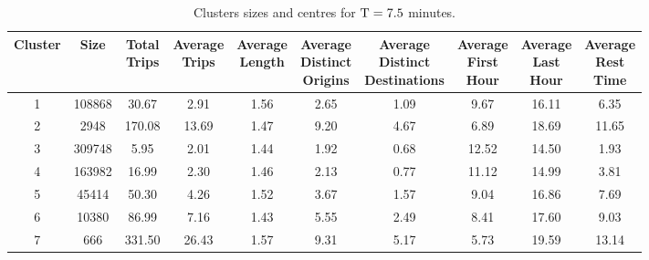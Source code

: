 \begin{table*}[t]
\centering
\small
\begin{tabular}{c c c c c c c c c c}
  \hline
 Cluster &  Size & \thead{Total\\Trips} & \thead{Average\\Trips} & \thead{Average\\Length} & \thead{Average\\Distinct\\Origins} & \thead{Average\\Distinct\\Destinations} & \thead{Average\\First\\Hour} & \thead{Average\\Last\\Hour} & \thead{Average\\Rest\\Time} \\
  \hline
  1 & 108868 & 30.67 & 2.91 & 1.56 & 2.65 & 1.09 & 9.67 & 16.11 & 6.35 \\
  2 & 2948 & 170.08 & 13.69 & 1.47 & 9.20 & 4.67 & 6.89 & 18.69 & 11.65 \\
  3 & 309748 & 5.95 & 2.01 & 1.44 & 1.92 & 0.68 & 12.52 & 14.50 & 1.93 \\
  4 & 163982 & 16.99 & 2.30 & 1.46 & 2.13 & 0.77 & 11.12 & 14.99 & 3.81 \\
  5 & 45414 & 50.30 & 4.26 & 1.52 & 3.67 & 1.57 & 9.04 & 16.86 & 7.69 \\
  6 & 10380 & 86.99 & 7.16 & 1.43 & 5.55 & 2.49 & 8.41 & 17.60 & 9.03 \\
  7 & 666 & 331.50 & 26.43 & 1.57 & 9.31 & 5.17 & 5.73 & 19.59 & 13.14 \\
   \hline
\end{tabular}
\caption{Clusters sizes and centres for $\mathrm{T} = 7.5$ minutes.}
\label{t:kmeans_centers_450}
\end{table*}

